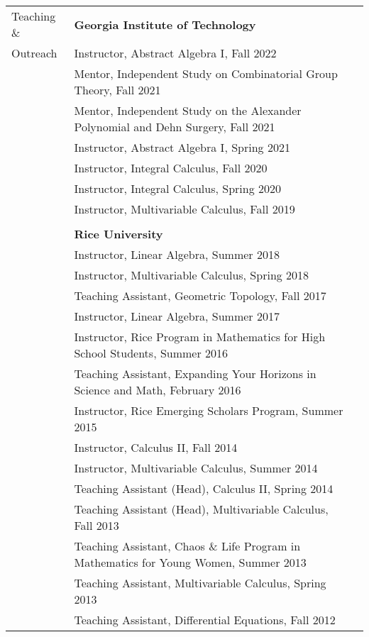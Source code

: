 \documentclass[letterpaper,11pt,oneside]{article}
\begin{document}
          \noindent \begin{tabular}{@{} l l l}
           
 
  \Large{Teaching \& }   & \textbf{Georgia Institute of Technology} \\
    \Large{Outreach}       & Instructor, Abstract Algebra I, Fall 2022\\   
     & Mentor, Independent Study on Combinatorial Group Theory, Fall 2021\\   
               & Mentor, Independent Study on the Alexander Polynomial and Dehn Surgery, Fall 2021\\   
              & Instructor, Abstract Algebra I, Spring 2021\\   
               & Instructor, Integral Calculus, Fall 2020 \\
       & Instructor, Integral Calculus, Spring 2020 \\

           & Instructor, Multivariable Calculus, Fall 2019 \\  
    
    \\
    & \textbf{Rice University} \\
    & Instructor, Linear Algebra, Summer 2018 \\
     & Instructor, Multivariable Calculus, Spring 2018 \\   
     & Teaching Assistant, Geometric Topology, Fall 2017 \\
     & Instructor, Linear Algebra, Summer 2017 \\
     
           
     & Instructor, Rice Program in Mathematics
for High School Students, Summer 2016 \\

           
  & Teaching Assistant,  Expanding Your Horizons in Science and Math, February 2016 \\
    & Instructor,  Rice Emerging Scholars Program, Summer 2015 \\
     & Instructor, Calculus II, Fall 2014 \\
     & Instructor, Multivariable Calculus, Summer 2014 \\   
    
        & Teaching Assistant (Head), Calculus II, Spring 2014 \\  
       & Teaching Assistant (Head), Multivariable Calculus, Fall 2013 \\
   & Teaching Assistant, Chaos \& Life Program in Mathematics for Young Women, Summer 2013 \\  
          & Teaching Assistant, Multivariable Calculus, Spring 2013 \\
       & Teaching Assistant, Differential Equations, Fall 2012 \\


\end{tabular}
\end{document}
